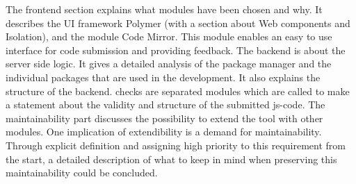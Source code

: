 The frontend section explains what modules have been chosen and why.
It describes the UI framework Polymer (with a section about Web components and
Isolation), and the module Code Mirror. This module enables an easy to use 
interface for code submission and providing feedback.
The backend is about the server side logic. It gives a detailed analysis of the
package manager and the individual packages that are used
in the development. It also explains the structure of the backend.
\Glspl{check} are separated modules which are called to make a statement
about the validity and structure of the submitted \gls{js-code}.
The maintainability part discusses the possibility to extend the tool with other 
modules. One implication of extendibility is a demand for maintainability. 
Through explicit definition and assigning high priority to this requirement from 
the start, a detailed description of what to keep in mind when 
preserving this maintainability could be concluded.





